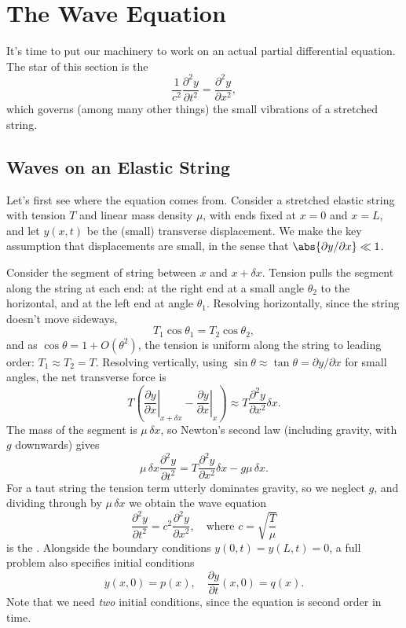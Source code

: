 \section{The Wave Equation}

It's time to put our machinery to work on an actual partial differential equation. The star of this section is the 
$$
\frac{1}{c^2} \frac{\partial^2 y}{\partial t^2} = \frac{\partial^2 y}{\partial x^2},
$$
which governs (among many other things) the small vibrations of a stretched string.

\subsection{Waves on an Elastic String}

Let's first see where the equation comes from. Consider a stretched elastic string with tension $T$ and linear mass density $\mu$, with ends fixed at $x = 0$ and $x = L$, and let $y(x, t)$ be the (small) transverse displacement. We make the key assumption that displacements are small, in the sense that $\abs{\partial y / \partial x} \ll 1$.

Consider the segment of string between $x$ and $x + \delta x$. Tension pulls the segment along the string at each end: at the right end at a small angle $\theta_2$ to the horizontal, and at the left end at angle $\theta_1$.
Resolving horizontally, since the string doesn't move sideways,
$$
T_1 \cos \theta_1 = T_2 \cos \theta_2,
$$
and as $\cos \theta = 1 + O(\theta^2)$, the tension is uniform along the string to leading order: $T_1 \approx T_2 = T$.
Resolving vertically, using $\sin \theta \approx \tan \theta = \partial y/\partial x$ for small angles, the net transverse force is
$$
T \left(\left.\frac{\partial y}{\partial x}\right|_{x + \delta x} - \left.\frac{\partial y}{\partial x}\right|_x \right) \approx T \frac{\partial^2 y}{\partial x^2} \delta x.
$$
The mass of the segment is $\mu \, \delta x$, so Newton's second law (including gravity, with $g$ downwards) gives
$$
\mu \, \delta x \frac{\partial^2 y}{\partial t^2} = T \frac{\partial^2 y}{\partial x^2}\delta x - g \mu\, \delta x.
$$
For a taut string the tension term utterly dominates gravity, so we neglect $g$, and dividing through by $\mu \, \delta x$ we obtain the wave equation
$$
\frac{\partial^2 y}{\partial t^2} = c^2 \frac{\partial^2 y}{\partial x^2}, \quad \text{where } c = \sqrt{\frac{T}{\mu}}
$$
is the . Alongside the boundary conditions $y(0, t) = y(L, t) = 0$, a full problem also specifies initial conditions
$$
y(x, 0) = p(x), \quad \frac{\partial y}{\partial t}(x, 0) = q(x).
$$
Note that we need \emph{two} initial conditions, since the equation is second order in time.

